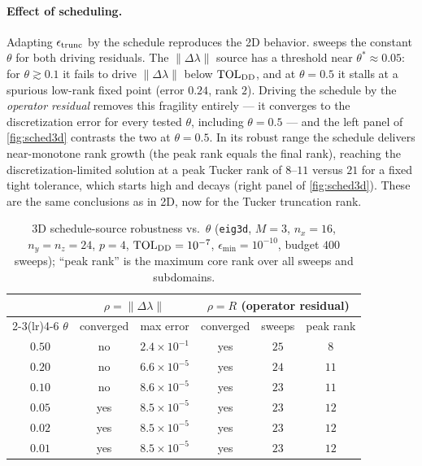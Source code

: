 \documentclass[hidelinks,onefignum,onetabnum]{siamart250211}
\newcommand{\TOL}{\mathrm{TOL}}
\begin{document}
\paragraph{Effect of scheduling.}  Adapting $\epsilon_{\rm trunc}$ by the
schedule reproduces the 2D behavior.   sweeps the constant
$\theta$ for both driving residuals.  The $\|\Delta\lambda\|$ source has a
threshold near $\theta^\ast\approx0.05$: for $\theta\gtrsim0.1$ it fails to drive
$\|\Delta\lambda\|$ below $\TOL_{\rm DD}$, and at $\theta=0.5$ it stalls at a
spurious low-rank fixed point (error $0.24$, rank $2$).  Driving the schedule by
the \emph{operator residual} removes this fragility entirely --- it converges to
the discretization error for every tested $\theta$, including $\theta=0.5$ --- and
the left panel of \cref{fig:sched3d} contrasts the two at $\theta=0.5$.  In its
robust range the schedule delivers near-monotone rank growth (the peak rank
equals the final rank), reaching the discretization-limited solution at a peak
Tucker rank of $8$--$11$ versus $21$ for a fixed tight tolerance, which starts
high and decays (right panel of \cref{fig:sched3d}).  These are the same
conclusions as in 2D, now for the Tucker truncation rank.

\begin{table}[htb]
\caption{3D schedule-source robustness vs.\ $\theta$ ({\tt eig3d}, $M=3$,
$n_x=16$, $n_y=n_z=24$, $p=4$, $\TOL_{\rm DD}=10^{-7}$, $\epsilon_{\min}=10^{-10}$,
budget $400$ sweeps); ``peak rank'' is the maximum core rank over all sweeps and
subdomains.\label{tab:sched3d}}
\begin{center}
\begin{tabular}{c c c c c c}
\toprule
 & \multicolumn{2}{c}{$\rho=\|\Delta\lambda\|$} & \multicolumn{3}{c}{$\rho=R$ (operator residual)} \\
\cmidrule(lr){2-3}\cmidrule(lr){4-6}
$\theta$ & converged & max error & converged & sweeps & peak rank \\
\midrule
$0.50$ & no  & $2.4\times10^{-1}$ & yes & $25$ & $8$  \\
$0.20$ & no  & $6.6\times10^{-5}$ & yes & $24$ & $11$ \\
$0.10$ & no  & $8.6\times10^{-5}$ & yes & $23$ & $11$ \\
$0.05$ & yes & $8.5\times10^{-5}$ & yes & $23$ & $12$ \\
$0.02$ & yes & $8.5\times10^{-5}$ & yes & $23$ & $12$ \\
$0.01$ & yes & $8.5\times10^{-5}$ & yes & $23$ & $12$ \\
\bottomrule
\end{tabular}
\end{center}
\end{table}
\end{document}
